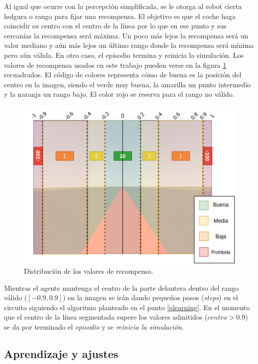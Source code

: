 Al igual que ocurre con la percepción simplificada, se le otorga al robot cierta holgura o rango para fijar una recompensa. El objetivo es que el coche haga coincidir su centro con el centro de la línea por lo que en ese punto y sus cercanías la recompensa será máxima. Un poco más lejos la recompensa será un valor mediano y aún más lejos un último rango donde la recompensa será mínima pero aún válida. En otro caso, el episodio termina y reinicia la simulación. Los valores de recompensa usados en este trabajo pueden verse en la figura \ref{fig:valores-recompensa} recuadrados. El código de colores representa cómo de buena es la posición del centro en la imagen, siendo el verde muy buena, la amarilla un punto intermedio y la naranja un rango bajo. El color rojo se reserva para el rango no válido.\\

\begin{figure}[!ht]
    \centering \includegraphics[width=0.7\columnwidth]{./figures/chapter_4/reward_distribution.png}
    \caption{
        \label{fig:valores-recompensa}
            Distribución de los valores de recompensa.
    }
\end{figure}

Mientras el agente mantenga el centro de la parte delantera dentro del rango válido ($[-0.9, 0.9]$) en la imagen se irán dando pequeños pasos (\textit{steps}) en el circuito siguiendo el algoritmo planteado en el punto \ref{qlearning}. En el momento que el centro de la línea segmentada supere los valores admitidos ($centro > 0.9$) se da por terminado el \textit{episodio} y se \textit{reinicia la simulación}.

\subsection{Aprendizaje y ajustes}

